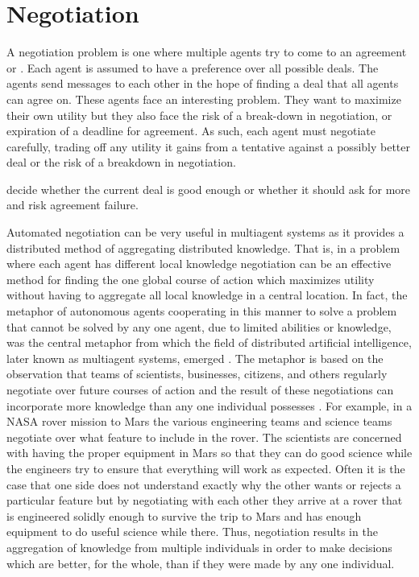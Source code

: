 \chapter{Negotiation}
\label{cha:negotiation}

A negotiation problem is one where multiple agents try to come to an
agreement or . Each agent is assumed to have a preference
over all possible deals.  The agents send messages to each other in
the hope of finding a deal that all agents can agree on. These agents
face an interesting problem. They want to maximize their own utility
but they also face the risk of a break-down in negotiation, or
expiration of a deadline for agreement. As such, each agent must
negotiate carefully, trading off any utility it gains from a tentative
against a possibly better deal or the risk of a breakdown in
negotiation.

decide whether the current deal is good enough or whether it should
ask for more and risk agreement failure.

Automated negotiation can be very useful in multiagent systems as it
provides a distributed method of aggregating distributed knowledge.
That is, in a problem where each agent has different local knowledge
negotiation can be an effective method for finding the one global
course of action which maximizes utility without having to aggregate
all local knowledge in a central location. In fact, the metaphor of
autonomous agents cooperating in this manner to solve a problem that
cannot be solved by any one agent, due to limited abilities or
knowledge, was the central metaphor from which the field of
distributed artificial intelligence, later known as multiagent
systems, emerged \cite{davis83a}. The metaphor is based on the
observation that teams of scientists, businesses, citizens, and others
regularly negotiate over future courses of action and the result of
these negotiations can incorporate more knowledge than any one
individual possesses \cite{surowiecki05a}. 
For example, in a NASA rover mission to Mars the various engineering
teams and science teams negotiate over what feature to include in the
rover. The scientists are concerned with having the proper equipment
in Mars so that they can do good science while the engineers try to
ensure that everything will work as expected. Often it is the case
that one side does not understand exactly why the other wants or
rejects a particular feature but by negotiating with each other they
arrive at a rover that is engineered solidly enough to survive the
trip to Mars and has enough equipment to do useful science while
there. Thus, negotiation results in the aggregation of knowledge from
multiple individuals in order to make decisions which are better, for
the whole, than if they were made by any one individual.


